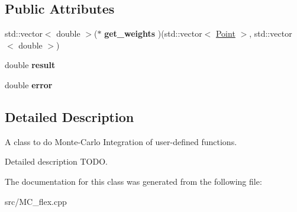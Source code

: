 \subsection*{Public Attributes}
\begin{DoxyCompactItemize}
\item 
\mbox{\label{class_m_c__integrate_a413afb40ea20a176cf507bfa930619a3}} 
std\+::vector$<$ double $>$($\ast$ {\bfseries get\+\_\+weights} )(std\+::vector$<$ \hyperlink{class_point}{Point} $>$, std\+::vector$<$ double $>$)
\item 
\mbox{\label{class_m_c__integrate_a4fd22a063b4f10b16dd947200cb8d0f0}} 
double {\bfseries result}
\item 
\mbox{\label{class_m_c__integrate_a912158b0f9f05889d97376dfa6a1524d}} 
double {\bfseries error}
\end{DoxyCompactItemize}


\subsection{Detailed Description}
A class to do Monte-\/\+Carlo Integration of user-\/defined functions. 

Detailed description T\+O\+DO. 

The documentation for this class was generated from the following file\+:\begin{DoxyCompactItemize}
\item 
src/M\+C\+\_\+flex.\+cpp\end{DoxyCompactItemize}
